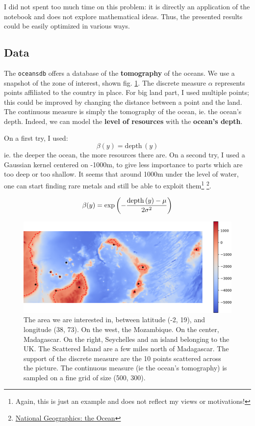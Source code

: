 I did not spent too much time on this problem: it is directly an application of the notebook and does not explore mathematical ideas. Thus, the presented results could be easily optimized in various ways. 

\subsection{Data}

The \texttt{oceansdb} offers a database of the \textbf{tomography} of the oceans. We use a snapshot of the zone of interest, shown fig. \ref{fig:initial_map}. The discrete measure $\alpha$ represents points affiliated to the country in place. For big land part, I used multiple points; this could be improved by changing the distance between a point and the land. The continuous measure is simply the tomography of the ocean, ie. the ocean's depth. Indeed, we can model the \textbf{level of resources} with the \textbf{ocean's depth}. 

On a first try, I used:
\begin{equation}
\label{eq:depth}
    \beta (y) = \mathrm{depth}\, (y)
\end{equation}
ie. the deeper the ocean, the more resources there are. On a second try, I used a Gaussian kernel centered on -1000m, to give less importance to parts which are too deep or too shallow. It seems that around 1000m under the level of water, one can start finding rare metals and still be able to exploit them\footnote{Again, this is just an example and does not reflect my views or motivations!} \footnote{\href{https://www.nationalgeographic.com/environment/habitats/ocean/}{National Geographics: the Ocean}}. 

\begin{equation}
\label{eq:gaussian_depth}
    \beta (y) = \exp\left( -\frac{\mathrm{depth}\,(y) - \mu}{2 \sigma^2} \right)
\end{equation}

\begin{figure}[h]
    \centering
    \includegraphics[width=.7\textwidth]{samples/3/starting_image.png}
    \caption{The area we are interested in, between latitude (-2, 19), and longitude (38, 73). On the west, the Mozambique. On the center, Madagascar. On the right, Seychelles and an island belonging to the UK. The Scattered Island are a few miles north of Madagascar. The support of the discrete measure are the 10 points scattered across the picture. The continuous measure (ie the ocean's tomography) is sampled on a fine grid of size (500, 300).}
    \label{fig:initial_map}
\end{figure}

